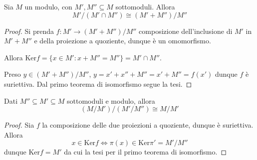 \begin{theorem}
    Sia \(M\) un modulo, con \(M', M'' \subseteq M \) sottomoduli. Allora 
    \[
      M' / (M' \cap  M'') \cong {(M' + M'')} / M''
    \]
\end{theorem}
\begin{proof}{}
    Si prenda \(f : M' \to (M' + M'') / M''\) composizione dell'inclusione di \(M'\) in \(M' + M''\) e della proiezione a quoziente, dunque è un omomorfismo.

    Allora \(\mathrm{Ker} f = \{x \in M' : x + M'' = M''\} = M' \cap  M'' \).

    Preso \(y \in {(M' + M'')}/M''\), \(y = x' + x'' + M''
     = x' + M'' = f{(x')}\) dunque \(f\) è suriettiva. Dal primo
     teorema di isomorfismo segue la tesi.
\end{proof}


\begin{theorem}
    Dati \(M'' \subseteq M' \subseteq M\)  sottomoduli e modulo, allora
    \[
      {({M}/{M'})} / {(M'/ M'')} \cong M / M'
    \]
\end{theorem}
\begin{proof}{}
    Sia \(f\) la composizione delle due proiezioni a quoziente, dunque è
    suriettiva. Allora
    \[
      x \in \mathrm{Ker}f \iff \pi{(x)} \in \mathrm{Ker}\pi' = M'/M''
    \]
    dunque \(\mathrm{Ker}f  = M'\) da cui la tesi per il primo teorema di
    isomorfismo.
\end{proof}


